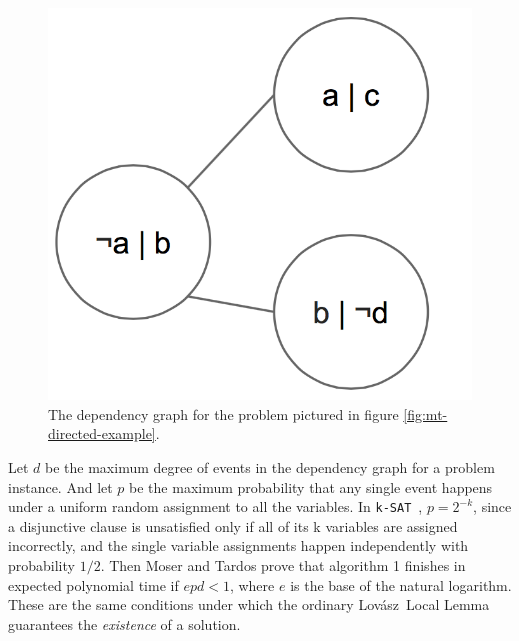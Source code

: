 \documentclass[twocolumn]{article}
\newcommand{\ksat}{\texttt{k-SAT}~}
\newcommand{\lovasz}{Lov\'{a}sz~}
\begin{document}
\begin{figure}[ht]
  \includegraphics[scale=0.5]{figures/mt-undirected-example.png}
  \caption{The dependency graph for the problem pictured in figure \ref{fig:mt-directed-example}.}
  \label{fig:mt-undirected-example}
\end{figure}

Let $d$ be the maximum degree of events in the dependency graph for a problem instance.  And let $p$ be the maximum probability that any single event happens under a uniform random assignment to all the variables.  In \ksat, $p = 2^{-k}$, since a disjunctive clause is unsatisfied only if all of its k variables are assigned incorrectly, and the single variable assignments happen independently with probability $1/2$.  Then Moser and Tardos prove that algorithm 1 finishes in expected polynomial time if $e p d < 1$, where $e$ is the base of the natural logarithm.  These are the same conditions under which the ordinary \lovasz Local Lemma guarantees the \emph{existence} of a solution.
\end{document}
